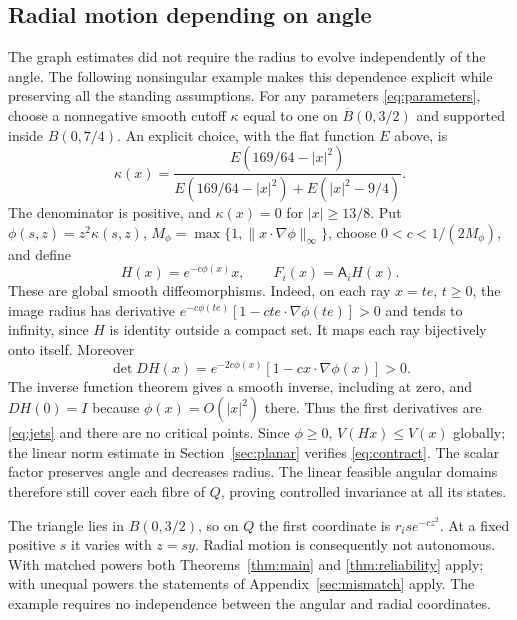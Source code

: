 \documentclass[11pt]{amsart}
\theoremstyle{definition}
\theoremstyle{remark}
\numberwithin{equation}{section}
\begin{document}
\subsection{Radial motion depending on angle}\label{sec:radialfeedback}
The graph estimates did not require the radius to evolve independently
of the angle. The following nonsingular example makes this dependence
explicit while preserving all the standing assumptions.
For any parameters \eqref{eq:parameters}, choose a nonnegative
smooth cutoff $\kappa$ equal to one on $\overline B(0,3/2)$ and
supported inside $B(0,7/4)$. An explicit choice, with the flat
function $E$ above, is
\[
\kappa(x)=\frac{E(169/64-|x|^2)}
 {E(169/64-|x|^2)+E(|x|^2-9/4)}.
\]
The denominator is positive, and $\kappa(x)=0$ for $|x|\ge13/8$.
Put $\phi(s,z)=z^2\kappa(s,z)$,
$M_\phi=\max\{1,\|x\cdot\nabla\phi\|_\infty\}$, choose
$0<c<1/(2M_\phi)$, and define
\begin{equation}\label{eq:radialfeedback}
H(x)=e^{-c\phi(x)}x,\qquad F_i(x)=\mathsf A_iH(x).
\end{equation}
These are global smooth diffeomorphisms. Indeed, on each ray
$x=te$, $t\ge0$, the image radius has derivative
$e^{-c\phi(te)}[1-cte\cdot\nabla\phi(te)]>0$ and tends to
infinity, since $H$ is identity outside a compact set. It maps
each ray bijectively onto itself. Moreover
\[
\det DH(x)=e^{-2c\phi(x)}[1-cx\cdot\nabla\phi(x)]>0.
\]
The inverse function theorem gives a smooth inverse, including
at zero, and $DH(0)=I$ because $\phi(x)=O(|x|^2)$ there.
Thus the first derivatives are \eqref{eq:jets} and there are no
critical points. Since $\phi\ge0$, $V(Hx)\le V(x)$ globally;
the linear norm estimate in Section~\ref{sec:planar} verifies
\eqref{eq:contract}. The scalar factor preserves angle and decreases
radius. The linear feasible angular domains therefore still cover
each fibre of $Q$, proving controlled invariance at all its states.

The triangle lies in $B(0,3/2)$, so on $Q$ the first coordinate
is $r_i s e^{-cz^2}$. At a fixed positive $s$ it varies with
$z=sy$. Radial motion is consequently not autonomous. With
matched powers both Theorems~\ref{thm:main} and
\ref{thm:reliability} apply; with unequal powers the statements
of Appendix~\ref{sec:mismatch} apply. The example requires no independence between the angular and radial
coordinates.
\end{document}
